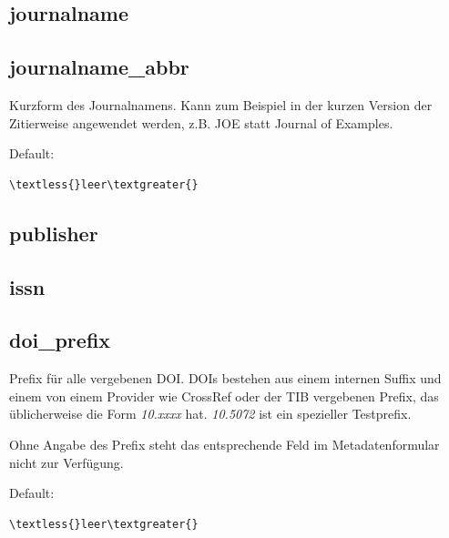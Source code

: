 \documentclass[a4paper,10pt,ngerman]{sphinxmanual}
\begin{document}
\subsection{journalname}
\label{metadata_properties:prop-journalname}\label{metadata_properties:journalname}

\subsection{journalname\_abbr}
\label{metadata_properties:journalname-abbr}\label{metadata_properties:prop-journalname-abbr}
Kurzform des Journalnamens. Kann zum Beispiel in der kurzen Version der Zitierweise
angewendet werden, z.B. JOE statt Journal of Examples.

Default:

\begin{Verbatim}[commandchars=\\\{\}]
\textless{}leer\textgreater{}
\end{Verbatim}


\subsection{publisher}
\label{metadata_properties:publisher}\label{metadata_properties:prop-publisher}

\subsection{issn}
\label{metadata_properties:prop-issn}\label{metadata_properties:issn}

\subsection{doi\_prefix}
\label{metadata_properties:prop-doi-prefix}\label{metadata_properties:doi-prefix}
Prefix für alle vergebenen DOI. DOIs bestehen aus einem internen Suffix und
einem von einem Provider wie CrossRef oder der TIB vergebenen Prefix, das
üblicherweise die Form \emph{10.xxxx} hat. \emph{10.5072} ist ein spezieller Testprefix.

Ohne Angabe des Prefix steht das entsprechende Feld im Metadatenformular nicht
zur Verfügung.

Default:

\begin{Verbatim}[commandchars=\\\{\}]
\textless{}leer\textgreater{}
\end{Verbatim}
\end{document}
